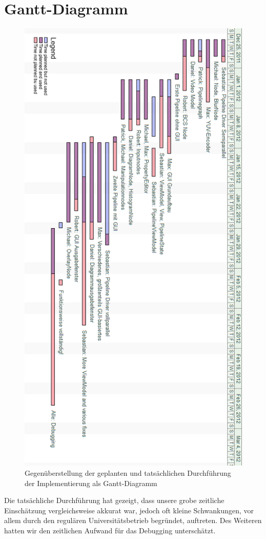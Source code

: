 \section{Gantt-Diagramm}

\begin{figure}[h!]
\begin{center}
\includegraphics[height=0.7\textheight]{ganttOverlay.png}
\end{center}
\caption{Gegenüberstellung der geplanten und tatsächlichen Durchführung der Implementierung als Gantt-Diagramm}
\end{figure}
Die tatsächliche Durchführung hat gezeigt, dass unsere grobe zeitliche Einschätzung vergleichsweise akkurat war, jedoch oft kleine Schwankungen, vor allem durch den regulären Universitätsbetrieb begründet, auftreten. Des Weiteren hatten wir den zeitlichen Aufwand für das Debugging unterschätzt.